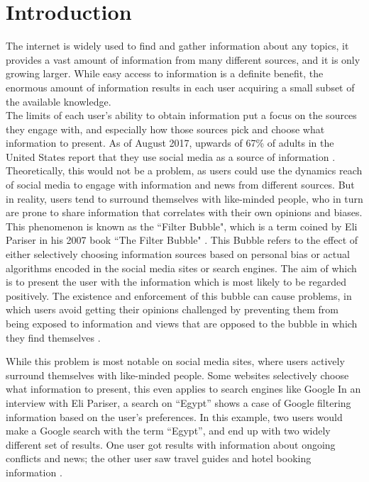 \chapter{Introduction}
The internet is widely used to find and gather information about any topics, it
provides a vast amount of information from many different sources, and it is
only growing larger. While easy access to information is a definite benefit, the
enormous amount of information results in each user acquiring a small subset of
the available knowledge.\\
The limits of each user's ability to obtain information put a focus on the
sources they engage with, and especially how those sources pick and choose what
information to present. As of August 2017, upwards of 67\% of adults in the
United States report that they use social media as a source of information
\citep{journalism2017}.
Theoretically, this would not be a problem, as users could use the dynamics
reach of social media to engage with information and news from different
sources. But in reality, users tend to surround themselves with like-minded
people, who in turn are prone to share information that correlates with their
own opinions and biases.\\

This phenomenon is known as the ``Filter Bubble", which is a term coined by Eli
Pariser in his 2007 book ``The Filter Bubble" \citep{pariser2011filter}.
This Bubble refers to the effect of either selectively choosing information
sources based on personal bias or actual algorithms encoded in the social media
sites or search engines.
The aim of which is to present the user with the information which is most
likely to be regarded positively.
The existence and enforcement of this bubble can cause problems, in which users
avoid getting their opinions challenged by preventing them from being exposed to
information and views that are opposed to the bubble in which they find
themselves \citep[p.59-73]{pariser2011filter}.\nl

While this problem is most notable on social media sites, where users actively
surround themselves with like-minded people. Some websites selectively choose
what information to present, this even applies to search engines like Google
\citep{filterBubbleDef} \citep{Personality} In an interview with Eli Pariser, a
search on ``Egypt'' shows a case of Google filtering information based on the
user's preferences. In this example, two users would make a Google search with
the term ``Egypt'', and end up with two widely different set of results.
One user got results with information about ongoing conflicts and news; the
other user saw travel guides and hotel booking information \citep{nusSduSearch}.
